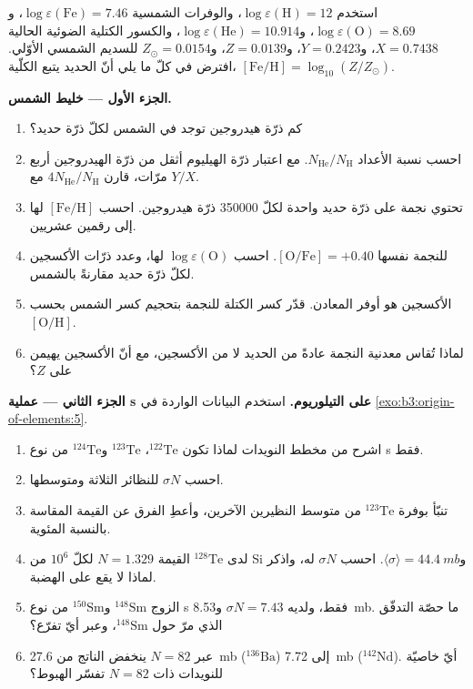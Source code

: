 \begin{problem}
\label{pb:b3:origin-of-elements:1}
استخدم $\log\varepsilon(\mathrm{H}) = 12$، والوفرات الشمسية
$\log\varepsilon(\mathrm{Fe}) = 7.46$، و$\log\varepsilon(\mathrm{O}) =
8.69$، و$\log\varepsilon(\mathrm{He}) = 10.914$، والكسور الكتلية الضوئية الحالية
$X = 0.7438$، و$Y = 0.2423$، و$Z = 0.0139$،
و$Z_\odot = 0.0154$ للسديم الشمسي الأوّلي. افترض في كلّ ما يلي أنّ الحديد
يتبع  الكلّية، $[\mathrm{Fe/H}] = \log_{10}(Z/Z_\odot)$.

\medskip\noindent\textbf{الجزء الأول --- خليط الشمس.}
\begin{enumerate}
\item كم ذرّة هيدروجين توجد في الشمس لكلّ ذرّة حديد؟
\item احسب نسبة الأعداد $N_\mathrm{He}/N_\mathrm{H}$. مع اعتبار
  ذرّة الهيليوم أثقل من ذرّة الهيدروجين أربع مرّات، قارن
  $4N_\mathrm{He}/N_\mathrm{H}$ مع $Y/X$.
\item تحتوي نجمة على ذرّة حديد واحدة لكلّ \num{350000} ذرّة هيدروجين.
  احسب $[\mathrm{Fe/H}]$ لها إلى رقمين عشريين.
\item للنجمة نفسها $[\mathrm{O/Fe}] = +0.40$. احسب
  $\log\varepsilon(\mathrm{O})$ لها، وعدد ذرّات الأكسجين لكلّ ذرّة حديد
  مقارنةً بالشمس.
\item الأكسجين هو أوفر المعادن. قدّر كسر الكتلة  للنجمة
  بتحجيم كسر الشمس بحسب $[\mathrm{O/H}]$.
\item لماذا تُقاس معدنية النجمة عادةً من الحديد
  لا من الأكسجين، مع أنّ الأكسجين يهيمن على $Z$؟
\end{enumerate}

\medskip\noindent\textbf{الجزء الثاني --- عملية s على التيلوريوم.} استخدم
البيانات الواردة في \cref{exo:b3:origin-of-elements:5}.
\begin{enumerate}[resume]
\item اشرح من مخطط النويدات لماذا تكون $^{122}\mathrm{Te}$،
  $^{123}\mathrm{Te}$ و$^{124}\mathrm{Te}$ من نوع s فقط.
\item احسب $\sigma N$ للنظائر الثلاثة ومتوسطها.
\item تنبّأ بوفرة $^{123}\mathrm{Te}$ من متوسط
  النظيرين الآخرين، وأعطِ الفرق عن القيمة المقاسة بالنسبة
  المئوية.
\item لدى $^{128}\mathrm{Te}$ القيمة $N = 1.329$ لكلّ $10^6$ من Si
  و$\langle\sigma\rangle = \qty{44.4}{mb}$. احسب $\sigma N$ له، واذكر
  لماذا لا يقع على الهضبة.
\item الزوج $^{148}\mathrm{Sm}$ و$^{150}\mathrm{Sm}$ من نوع s فقط، ولديه
  $\sigma N = \num{7.43}$ و\qty{8.53}{mb}. ما حصّة التدفّق
  الذي مرّ حول $^{148}\mathrm{Sm}$، وعبر أيّ تفرّع؟
\item عبر $N = 82$ ينخفض الناتج من \qty{27.6}{mb}
  ($^{136}\mathrm{Ba}$) إلى \qty{7.72}{mb} ($^{142}\mathrm{Nd}$). أيّ
  خاصيّة للنويدات ذات $N = 82$ تفسّر الهبوط؟
\end{enumerate}


\end{problem}
